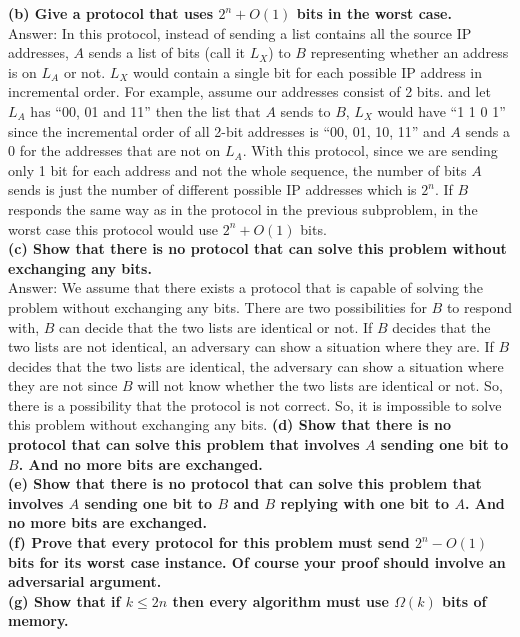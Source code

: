 \documentclass{article}
\begin{document}
\textbf{(b) Give a protocol that uses $2^n + O(1)$ bits in the worst case. } \\ \newline
Answer: In this protocol, instead of sending a list contains all the source IP addresses, $A$ sends a list of bits (call it $L_X$) to $B$ representing whether an address is on $L_A$ or not. $L_X$ would contain a single bit for each possible IP address in incremental order. For example, assume our addresses consist of 2 bits. and let $L_A$ has ``00, 01 and 11''  then the list that $A$ sends to $B$, $L_X$ would have ``1 1 0 1'' since the incremental order of all 2-bit addresses is ``00, 01, 10, 11'' and $A$ sends a 0 for the addresses that are not on $L_A$. With this protocol, since we are sending only 1 bit for each address and not the whole sequence, the number of bits $A$ sends is just the number of different possible IP addresses which is $2^n$. If $B$ responds the same way as in the protocol in the previous subproblem, in the worst case this protocol would use $2^n + O(1)$ bits.  \\ \newline
\textbf{(c) Show that there is no protocol that can solve this problem without exchanging any bits.} \\ \newline
Answer:  We assume that there exists a protocol that is capable of solving the problem without exchanging any bits. There are two possibilities for $B$ to respond with, $B$ can decide that the two lists are identical or not. If $B$ decides that the two lists are not identical, an adversary can show a situation where they are. If $B$ decides that the two lists are identical, the adversary can show a situation where they are not since $B$ will not know whether the two lists are identical or not. So, there is a possibility that the protocol is not correct. So, it is impossible to solve this problem without exchanging any bits.
\textbf{(d) Show that there is no protocol that can solve this problem that involves $A$ sending one bit to $B$. And no more bits are exchanged.} \\ \newline
\textbf{(e) Show that there is no protocol that can solve this problem that involves $A$ sending one bit to $B$ and $B$ replying with one bit to $A$. And no more bits are exchanged.} \\ \newline
\textbf{(f) Prove that every protocol for this problem must send $2^n - O(1)$ bits for its worst case instance. Of course your proof should involve an adversarial argument.} \\ \newline
\textbf{(g) Show that if $k\leq 2n$ then every algorithm must use $\Omega(k)$ bits of memory.} \\ \newline
\end{document}
